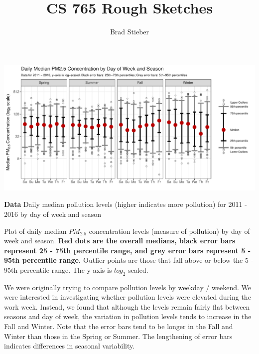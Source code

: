 \documentclass[landscape]{article}
\title{CS 765 Rough Sketches}
\author{Brad Stieber}
\date{}
\begin{document}
\maketitle

\section{\texorpdfstring{}{}}\label{section}

\newpage 

\begin{center}\includegraphics{RoughSketches_files/figure-latex/unnamed-chunk-2-1} \end{center}

\textbf{Data} Daily median pollution levels (higher indicates more
pollution) for 2011 - 2016 by day of week and season

Plot of daily median \(PM_{2.5}\) concentration levels (measure of
pollution) by day of week and season. \textbf{Red dots are the overall
medians, black error bars represent 25 - 75th percentile range, and grey
error bars represent 5 - 95th percentile range.} Outlier points are
those that fall above or below the 5 - 95th percentile range. The y-axis
is \(log_2\) scaled.

We were originally trying to compare pollution levels by weekday /
weekend. We were interested in investigating whether pollution levels
were elevated during the work week. Instead, we found that although the
levels remain fairly flat between seasons and day of week, the variation
in pollution levels tends to increase in the Fall and Winter. Note that
the error bars tend to be longer in the Fall and Winter than those in
the Spring or Summer. The lengthening of error bars indicates
differences in seasonal variability.

\newpage
\end{document}

